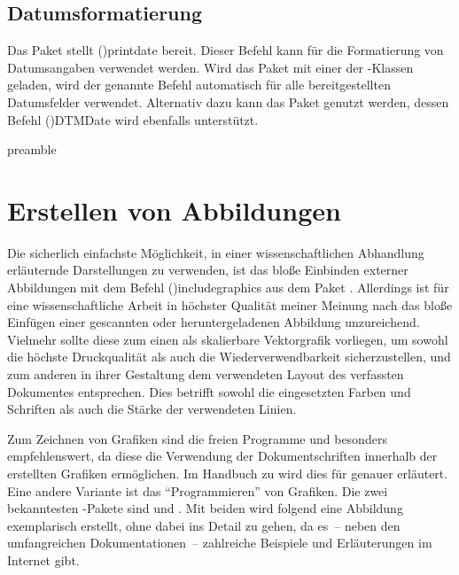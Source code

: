 \documentclass[%
  english,ngerman,%
  cdgeometry=no,DIV=12,%
  cd=false,cdfont=false,cdtitle=true,%
  headings=normal,%
  automark,%
  listof=toc,%
]{tudscrartcl}
\begin{document}
\subsection{Datumsformatierung}

Das Paket  stellt \Macro(){printdate} bereit. 
Dieser Befehl kann für die Formatierung von Datumsangaben verwendet werden. 
Wird das Paket mit einer der \TUDScript-Klassen geladen, wird der genannte 
Befehl automatisch für alle bereitgestellten Datumsfelder verwendet. Alternativ 
dazu kann das Paket  genutzt werden, dessen Befehl 
\Macro(){DTMDate} wird ebenfalls unterstützt.
%
\begin{Code}{preamble}
\usepackage{isodate}

\end{Code}



\section{%
  Erstellen von Abbildungen%
  \label{sec:figures}%
}

Die sicherlich einfachste Möglichkeit, in einer wissenschaftlichen Abhandlung 
erläuternde Darstellungen zu verwenden, ist das bloße Einbinden externer 
Abbildungen mit dem Befehl \Macro(){includegraphics} aus dem 
Paket . 
Allerdings ist für eine wissenschaftliche Arbeit in höchster Qualität meiner 
Meinung nach das bloße Einfügen einer gescannten oder heruntergeladenen 
Abbildung unzureichend. Vielmehr sollte diese zum einen als skalierbare 
Vektorgrafik vorliegen, um sowohl die höchste Druckqualität als auch die 
Wiederverwendbarkeit sicherzustellen, und zum anderen in ihrer Gestaltung dem 
verwendeten Layout des verfassten Dokumentes entsprechen. Dies betrifft sowohl 
die eingesetzten Farben und Schriften als auch die Stärke der verwendeten 
Linien.

Zum Zeichnen von Grafiken sind die freien Programme  und 
besonders  empfehlenswert, da diese die Verwendung der 
Dokumentschriften innerhalb der erstellten Grafiken ermöglichen. Im Handbuch zu 
\TUDScript wird dies für  
genauer erläutert. Eine andere Variante ist das \enquote{Programmieren} von 
Grafiken. Die zwei bekanntesten -Pakete sind 
und . Mit beiden wird folgend eine Abbildung exemplarisch 
erstellt, ohne dabei ins Detail zu gehen, da es~-- neben den umfangreichen 
Dokumentationen~-- zahlreiche Beispiele und Erläuterungen im Internet gibt.
\end{document}
